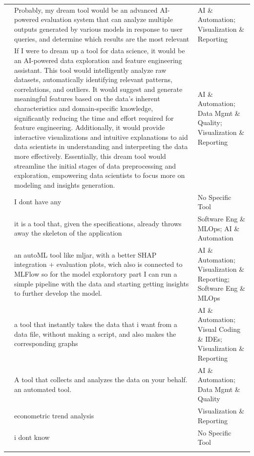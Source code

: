 \documentclass[11pt]{article}
\begin{document}
\begin{longtable}{l p{8.5cm} p{4.5cm}}
\addlinespace
41 & Probably, my dream tool would be an advanced AI-powered evaluation system that can analyze multiple outputs generated by various models in response to user queries, and determine which results are the most relevant & AI \& Automation; Visualization \& Reporting \\
\addlinespace
42 & If I were to dream up a tool for data science, it would be an AI-powered data exploration and feature engineering assistant. This tool would intelligently analyze raw datasets, automatically identifying relevant patterns, correlations, and outliers. It would suggest and generate meaningful features based on the data's inherent characteristics and domain-specific knowledge, significantly reducing the time and effort required for feature engineering. Additionally, it would provide interactive visualizations and intuitive explanations to aid data scientists in understanding and interpreting the data more effectively. Essentially, this dream tool would streamline the initial stages of data preprocessing and exploration, empowering data scientists to focus more on modeling and insights generation. & AI \& Automation; Data Mgmt \& Quality; Visualization \& Reporting \\
\addlinespace
43 & I dont have any & No Specific Tool \\
\addlinespace
44 & it is a tool that, given the specifications, already throws away the skeleton of the application & Software Eng \& MLOps; AI \& Automation \\
\addlinespace
45 & an autoML tool like mljar, with a better SHAP integration + evaluation plots, wich also is connected to MLFlow so for the model exploratory part I can run a simple pipeline with the data and starting getting insights to further develop the model. & AI \& Automation; Visualization \& Reporting; Software Eng \& MLOps \\
\addlinespace
46 & a tool that instantly takes the data that i want from a data file, without making a script, and also makes the corresponding graphs & AI \& Automation; Visual Coding \& IDEs; Visualization \& Reporting \\
\addlinespace
47 & A tool that collects and analyzes the data on your behalf. an automated tool. & AI \& Automation; Data Mgmt \& Quality \\
\addlinespace
48 & econometric trend analysis & Visualization \& Reporting \\
\addlinespace
49 & i dont know & No Specific Tool \\
\addlinespace

\end{longtable}
\end{document}
